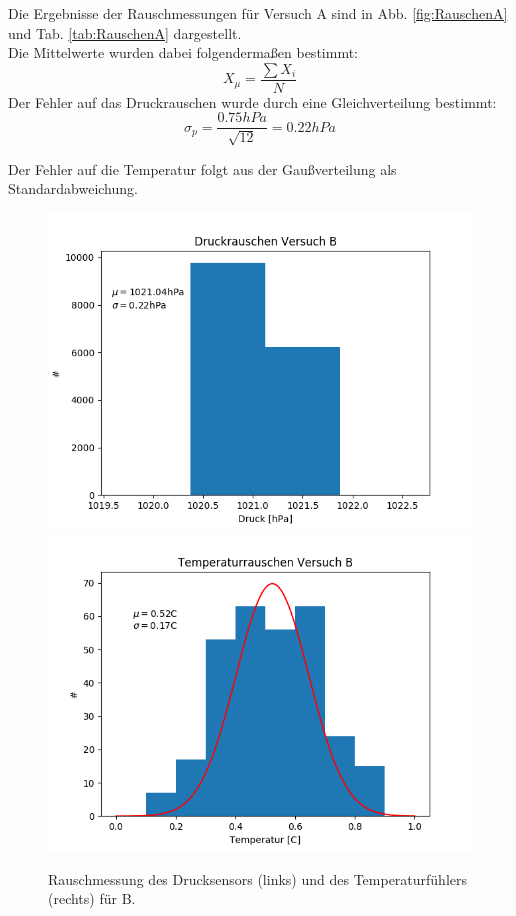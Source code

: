 \documentclass[12pt,a4paper]{article}
\begin{document}
Die Ergebnisse der Rauschmessungen für Versuch A sind in Abb. \ref{fig:RauschenA} und Tab. \ref{tab:RauschenA} dargestellt.\\
Die Mittelwerte wurden dabei folgendermaßen bestimmt:
\begin{equation}
X_{\mu} = \dfrac{\sum X_{i}}{N}  
\end{equation}
Der Fehler auf das Druckrauschen wurde durch eine Gleichverteilung bestimmt:
\begin{equation}
\sigma_p =\dfrac{0.75hPa}{\sqrt{12}} = 0.22hPa
\end{equation}

Der Fehler auf die Temperatur folgt aus der Gaußverteilung als Standardabweichung.






\begin{figure}[H]
\includegraphics[scale=0.5]{Bilder/DruckrauschenB}
\includegraphics[scale=0.5]{Bilder/TemprauschenB}
\caption[Rauschmessung Versuch B]{Rauschmessung des Drucksensors (links) und des Temperaturfühlers (rechts) für B.}
\label{fig:RauschenB}
\end{figure}
\end{document}
